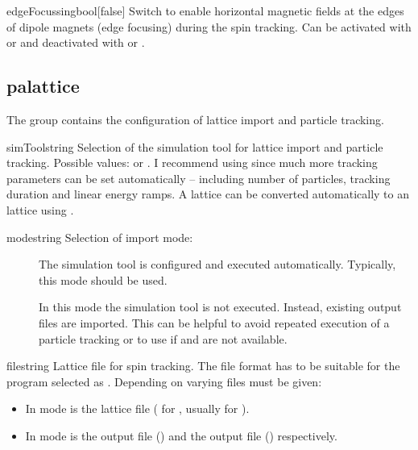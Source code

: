 \documentclass[a4paper]{scrartcl}
\begin{document}
\begin{configdoc}{edgeFocussing}{bool}{}[false]
  Switch to enable horizontal magnetic fields at the edges of dipole magnets (edge
  focusing) during the spin tracking. Can be activated with  or
   and deactivated with  or .
\end{configdoc}




\subsection{palattice}
\label{sec:config-pal}
The group  contains the configuration of lattice import and
particle tracking.\\[2mm]

\begin{configdoc}{simTool}{string}{}
  Selection of the simulation tool for lattice import and particle tracking. Possible values:
   or . I recommend using \ele since much more tracking
  parameters can be set automatically -- including number of particles, tracking duration
  and linear energy ramps. A \madx lattice can be converted automatically to an \ele
  lattice using \pal.
\end{configdoc}

\begin{configdoc}{mode}{string}{}
  Selection of import mode:
  \begin{description}
  \item[] The simulation tool is configured and executed automatically.
    Typically, this mode should be used.
  \item[] In this mode the simulation tool is not executed. Instead,
    existing output files are imported. This can be helpful to avoid repeated execution of
    a particle tracking or to use \polem if \ele and \madx are not available.
  \end{description}
\end{configdoc}

\begin{configdoc}{file}{string}{}
  Lattice file for spin tracking. The file format has to be suitable for the program
  selected as .
  Depending on  varying files must be given:
  \begin{itemize}
  \item In  mode  is the lattice file
    ( for \ele, usually  for \madx).
  \item In  mode  is the  output
    file (\ele) and the  output file (\madx) respectively.
  \end{itemize}
\end{configdoc}
\end{document}
